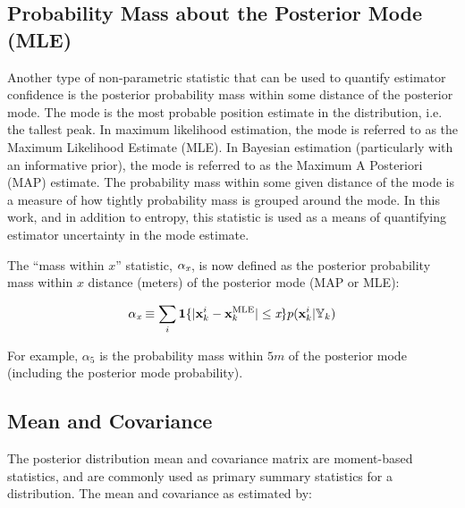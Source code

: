 \subsection{Probability Mass about the Posterior Mode (MLE)}
\label{framework.Statistics.Probability}

Another type of non-parametric statistic that can be used to quantify estimator confidence is the posterior probability mass within some distance of the posterior mode.
The mode is the most probable position estimate in the distribution, i.e. the tallest peak.
In maximum likelihood estimation, the mode is referred to as the Maximum Likelihood Estimate (MLE).
In Bayesian estimation (particularly with an informative prior), the mode is referred to as the Maximum A Posteriori (MAP) estimate.
The probability mass within some given distance of the mode is a measure of how tightly probability mass is grouped around the mode.
In this work, and in addition to entropy, this statistic is used as a means of quantifying estimator uncertainty in the mode estimate.

The ``mass within $x$'' statistic, $\alpha_\emph{x}$, is now defined as the posterior probability mass within $x$ distance (meters) of the posterior mode (MAP or MLE):

\begin{equation}
\alpha_\emph{x} \equiv \sum_i \mathbf{1}\{ | \mathbf{x}_k^{i} - \mathbf{x}_k^{\text{MLE}} | \leq \emph{x}\} p(\mathbf{x}_k^{i} | \mathbb{Y}_k)
\label{eq:alpha}
\end{equation}

For example, $\alpha_5$ is the probability mass within $5m$ of the posterior mode (including the posterior mode probability).

%

\subsection{Mean and Covariance}
\label{framework.Statistics.Moments}

The posterior distribution mean and covariance matrix are moment-based statistics, and are commonly used as primary summary statistics for a distribution.
The mean and covariance as estimated by:

